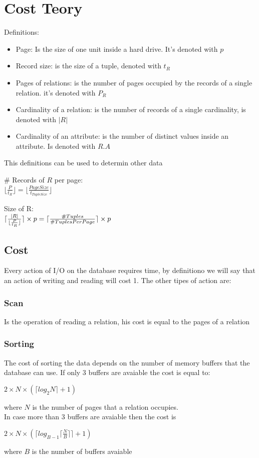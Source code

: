 \documentclass[12pt, a4paper]{article}
\DeclarePairedDelimiter{\ceil}{\lceil}{\rceil}
\begin{document}
\section{Cost Teory}
Definitions:
\begin{itemize}
    \item Page: Is the size of one unit inside a hard drive. It's denoted with $p$
    \item Record size: is the size of a tuple, denoted with $t_{R}$
    \item Pages of relations: is the number of pages occupied by the records of a single relation. it's denoted with $P_{R}$
    \item Cardinality of a relation: is the number of records of a single cardinality, is denoted with $|R|$
    \item Cardinality of an attribute: is the number of distinct values inside an attribute. Is denoted with $R.A$
\end{itemize}

This definitions can be used to determin other data

\begin{center}
    \# Records of $R$ per page:\\ $\lfloor \frac{P}{t_{R}}\rfloor = \lfloor \frac{PageSize}{t_{TupleSize}}\rfloor$

    Size of R:\\ $\ceil{\frac{|R|}{\lfloor\frac{P}{t_{R}}\rfloor}} \times p = \ceil{\frac{\# Tuples}{\# TuplesPerPage}} \times p$
\end{center}

\subsection{Cost}
Every action of I/O on the database requires time, by definitiono we will say that an action of writing and reading will cost 1.
The other tipes of action are:

\subsubsection*{Scan}
Is the operation of reading a relation, his cost is equal to the pages of a relation

\subsubsection*{Sorting}
The cost of sorting the data depends on the number of memory buffers that the database can use. If only 3 buffers are avaiable 
the cost is equal to:
\begin{center}
    $2\times N\times (\lceil log_{2}N\rceil+1)$
\end{center}
where $N$ is the number of pages that a relation occupies.\\In case more than 3 buffers are avaiable then the cost is
\begin{center}
    $2\times N\times (\lceil log_{B-1}\lceil\frac{N}{B}\rceil\rceil+1)$
\end{center}
where $B$ is the number of buffers avaiable
\end{document}
